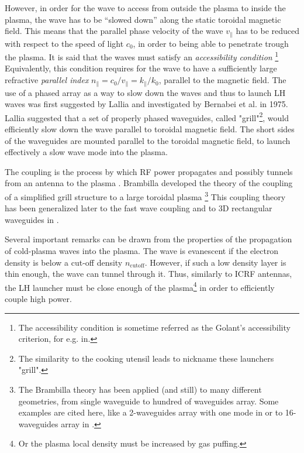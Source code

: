 However, in order for the wave to access from outside the plasma to inside the plasma, the wave has to be “slowed down” along the static toroidal magnetic field. This means that the parallel phase velocity of the wave $v_{\parallel}$ has to be reduced with respect to the speed of light $c_0$, in order to being able to penetrate trough the plasma. It is said that the waves must satisfy an \emph{accessibility condition} \footnote{The accessibility condition is sometime referred as the Golant's accessibility criterion, for e.g. in.} Equivalently, this condition requires for the wave to have a sufficiently large refractive \emph{parallel index} $n_{\parallel} = c_0/v_{\parallel} = k_{\parallel}/k_0$, parallel to the magnetic field. The use of a phased array as a way to slow down the waves and thus to launch LH waves was first suggested by Lallia and investigated by Bernabei et al. in 1975. Lallia suggested that a set of properly phased waveguides, called "grill"\footnote{The similarity to the cooking utensil leads to nickname these launchers "grill".}, would efficiently slow down the wave parallel to toroidal magnetic field. The short sides of the waveguides are mounted parallel to the toroidal magnetic field, to launch effectively a slow wave mode into the plasma. 

The coupling is the process by which RF power propagates and possibly tunnels from an antenna to the plasma . Brambilla developed the theory of the coupling of  a simplified grill structure to a large toroidal plasma  \footnote{The Brambilla theory has been applied (and still) to many different geometries, from single waveguide to hundred of waveguides array. Some examples are cited here, like a 2-waveguides array with one mode in  or to 16-waveguides array in .} This coupling theory has been generalized later to the fast wave coupling  and to 3D rectangular waveguides in . 

Several important remarks can be drawn from the properties of the propagation of cold-plasma waves into the plasma. The wave is evanescent if the electron density is below a cut-off density $n_{\mathrm{cutoff}}$. However, if such a low density layer is thin enough, the wave can tunnel through it. Thus, similarly to ICRF antennas, the LH launcher must be close enough of the plasma\footnote{Or the plasma local density must be increased by gas puffing.} in order to efficiently couple high power. 

